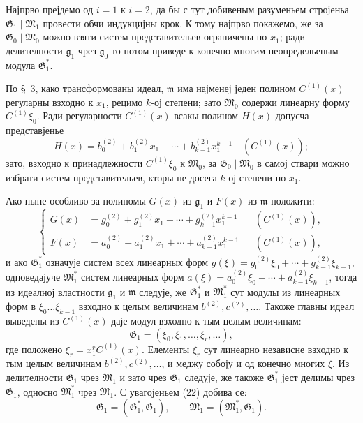 \documentclass[11pt]{article}
\providecommand{\Gmod}{\mathfrak G}
\providecommand{\Mmod}{\mathfrak M}
\providecommand{\mideal}{\mathfrak m}
\providecommand{\gideal}{\mathfrak g}
\begin{document}
Најпрво прејдемо од $i=1$ к $i=2$, да бы с тут добивеным разуменьем стројеньа $\Gmod_1\mid\Mmod_1$ провести обчи индукцијны крок. К тому најпрво покажемо, же за $\Gmod_0\mid\Mmod_0$ можно взяти систем представительев ограничены по $x_1$; ради делителности $\gideal_1$ чрез $\gideal_0$ то потом приведе к конечно многим неопредельеным модула $\Gmod^*_1$.

По §~3, како трансформованы идеал, $\mideal$ има најменеј једен полином $C^{(1)}(x)$ регуларны взходно к $x_1$, рецимо $k$-ој степени; зато $\Mmod_0$ содержи линеарну форму $C^{(1)}\xi_0$. Ради регуларности $C^{(1)}(x)$ всакы полином $H(x)$ допусча представјенье
\begin{equation}
 H(x)=b^{(2)}_0+b^{(2)}_1x_1+\cdots+b^{(2)}_{k-1}x_1^{k-1}\quad (C^{(1)}(x));
\tag{21}
\end{equation}
зато, взходно к принадлежности $C^{(1)}\xi_0$ к $\Mmod_0$, за $\Gmod_0\mid\Mmod_0$ в самој ствари можно избрати систем представительев, кторы не досега $k$-ој степени по $x_1$.

Ако ныне особливо за полиномы $G(x)$ из $\gideal_1$ и $F(x)$ из $\mideal$ положити:
\begin{equation}
 \left\{\begin{aligned}
  G(x)&=g^{(2)}_0+g^{(2)}_1x_1+\cdots+g^{(2)}_{k-1}x_1^{k-1} &&(C^{(1)}(x)),\\
  F(x)&=a^{(2)}_0+a^{(2)}_1x_1+\cdots+a^{(2)}_{k-1}x_1^{k-1} &&(C^{(1)}(x)),
 \end{aligned}\right.
\tag{22}
\end{equation}
и ако $\Gmod^*_1$ означује систем всех линеарных форм $g(\xi)=g^{(2)}_0\xi_0+\cdots+g^{(2)}_{k-1}\xi_{k-1}$, одповедајуче $\Mmod^*_1$ систем линеарных форм $a(\xi)=a^{(2)}_0\xi_0+\cdots+a^{(2)}_{k-1}\xi_{k-1}$, тогда из идеалној властности $\gideal_1$ и $\mideal$ следује, же $\Gmod^*_1$ и $\Mmod^*_1$ сут модулы из линеарных форм в $\xi_0\ldots\xi_{k-1}$ взходно к целым величинам $b^{(2)},c^{(2)},\ldots$. Такоже главны идеал выведены из $C^{(1)}(x)$ даје модул взходно к тым целым величинам:
\[
 \Gmod_1=(\xi_0,\xi_1,\ldots,\xi_r,\ldots),
\]
где положено $\xi_r=x_1^rC^{(1)}(x)$. Елементы $\xi_r$ сут линеарно независне взходно к тым целым величинам $b^{(2)},c^{(2)},\ldots$, и меджу собоју и од конечно многих $\xi$. Из делителности $\Gmod_1$ чрез $\Mmod_1$ и зато чрез $\Gmod_1$ следује, же такоже $\Gmod^*_1$ јест делимы чрез $\Gmod_1$, односно $\Mmod^*_1$ чрез $\Mmod_1$. С увагојеньем (22) добива се:
\begin{equation}
 \Gmod_1=(\Gmod^*_1,\Gmod_1),\qquad
 \Mmod_1=(\Mmod^*_1,\Gmod_1).
\tag{23}
\end{equation}
\end{document}
